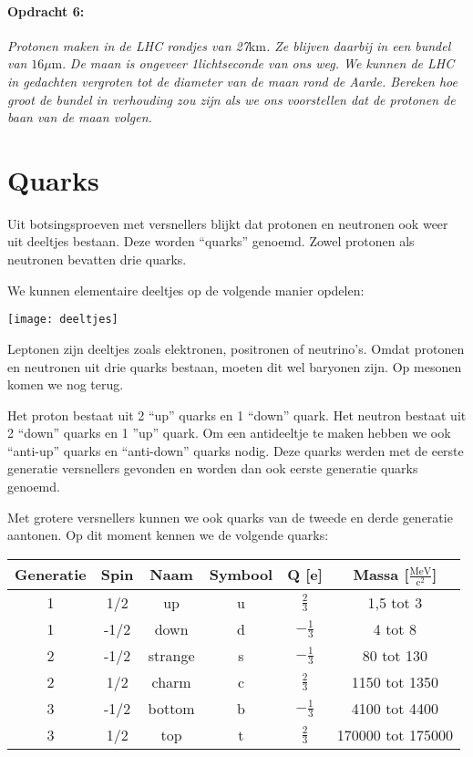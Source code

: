 \paragraph*{Opdracht 6:}

\emph{Protonen maken in de LHC rondjes van 27}km\emph{. Ze blijven
daarbij in een bundel van }$16\mu\mathrm{m}$. \emph{De maan is ongeveer
1lichtseconde van ons weg. We kunnen de LHC in gedachten vergroten
tot de diameter van de maan rond de Aarde. Bereken hoe groot de bundel
in verhouding zou zijn als we ons voorstellen dat de protonen de baan
van de maan volgen.}


\section{Quarks}

Uit botsingsproeven met versnellers blijkt dat protonen en neutronen
ook weer uit deeltjes bestaan. Deze worden ``quarks'' genoemd. Zowel
protonen als neutronen bevatten drie quarks.

We kunnen elementaire deeltjes op de volgende manier opdelen:

\noindent \begin{center}
\texttt{[image: deeltjes]}
\par\end{center}

Leptonen zijn deeltjes zoals elektronen, positronen of neutrino's.
Omdat protonen en neutronen uit drie quarks bestaan, moeten dit wel
baryonen zijn. Op mesonen komen we nog terug. 

Het proton bestaat uit 2 ``up'' quarks en 1 ``down'' quark. Het
neutron bestaat uit 2 ``down'' quarks en 1 ''up'' quark. Om een
antideeltje te maken hebben we ook ``anti-up'' quarks en ``anti-down''
quarks nodig. Deze quarks werden met de eerste generatie versnellers
gevonden en worden dan ook eerste generatie quarks genoemd.

Met grotere versnellers kunnen we ook quarks van de tweede en derde
generatie aantonen. Op dit moment kennen we de volgende quarks:

\noindent \begin{center}
\begin{tabular}{|c|c|c|c|c|c|}
\hline 
Generatie & Spin & Naam & Symbool & Q {[}e{]} & Massa {[}$\mathrm{\frac{MeV}{c^{2}}}${]}\tabularnewline
\hline 
\hline 
1 & 1/2 & up & u & $\frac{2}{3}$ & 1,5 tot 3\tabularnewline
\hline 
1 & -1/2 & down & d & $-\frac{1}{3}$ & 4 tot 8\tabularnewline
\hline 
2 & -1/2 & strange & s & $-\frac{1}{3}$ & 80 tot 130\tabularnewline
\hline 
2 & 1/2 & charm & c & $\frac{2}{3}$ & 1150 tot 1350\tabularnewline
\hline 
3 & -1/2 & bottom & b & $-\frac{1}{3}$ & 4100 tot 4400\tabularnewline
\hline 
3 & 1/2 & top & t & $\frac{2}{3}$ & 170000 tot 175000\tabularnewline
\hline 
\end{tabular}
\par\end{center}


